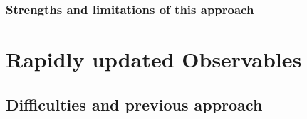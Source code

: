 	
	
		\subsubsection{Strengths and limitations of this approach} 

\section{Rapidly updated Observables}
\label{sec:RapidlyUpdatedObservables}
	
	\subsection{Difficulties and previous approach}
	
